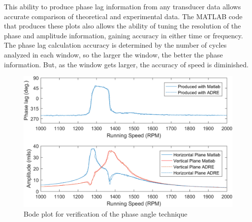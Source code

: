 		This ability to produce phase lag information from any transducer data allows accurate comparison of theoretical and experimental data. The MATLAB code that produces these plots also allows the ability of tuning the resolution of the phase and amplitude information, gaining accuracy in either time or frequency. The phase lag calculation accuracy is determined by the number of cycles analyzed in each window, so the larger the window, the better the phase information. But, as the window gets larger, the accuracy of speed is diminished.\par 
		\begin{figure}[H]	
			\centering
			\includegraphics[width=.75\linewidth]{./figures/Images/Figure_10}
			\caption{Bode plot for verification of the phase angle technique}
			\label{fig:Figure_10}
		\end{figure}
